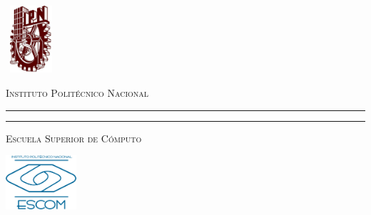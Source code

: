 \documentclass[letter]{letter}
\begin{document}
	
	\thispagestyle{empty}
	
	\begin{minipage}[c][0.1\textheight][c]{0.2\textwidth}
		\begin{center}
			\includegraphics[width=1.9cm, height=2.5cm]{Images/logo_ipn.jpg}
		\end{center}
	\end{minipage}
	\begin{minipage}[c][0.1\textheight][t]{0.6\textwidth}
		\begin{center}
			{\scshape {\Large Instituto Polit\'ecnico Nacional}}
			\vspace{.3cm}
			\hrule height2.5pt
			\vspace{.1cm}
			\hrule height1pt
			\vspace{.3cm}
			{\scshape  {\large Escuela Superior de C\'omputo} }
		\end{center}
	\end{minipage}
	\begin{minipage}[c][0.1\textheight][c]{0.2\textwidth}
			\begin{center}
				\includegraphics[height=2cm]{Images/escudoESCOM.png}
			\end{center}
	\end{minipage}
	
	\vspace{1cm}
	
\end{document}
